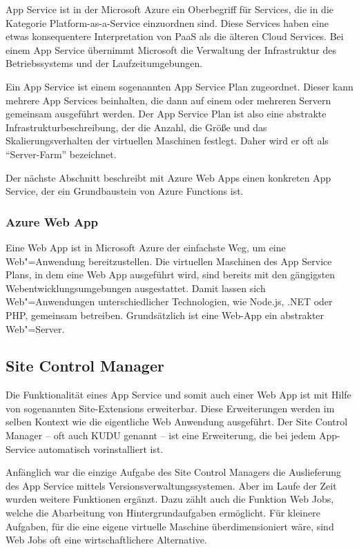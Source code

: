 App Service ist in der Microsoft Azure ein Oberbegriff für Services, die in die Kategorie Platform-as-a-Service einzuordnen sind. Diese Services haben eine etwas konsequentere Interpretation von PaaS als die älteren Cloud Services. Bei einem App Service übernimmt Microsoft die Verwaltung der Infrastruktur des Betriebssystems und der Laufzeitumgebungen. 

Ein App Service ist einem sogenannten App Service Plan zugeordnet. Dieser kann mehrere App Services beinhalten, die dann auf einem oder mehreren Servern gemeinsam ausgeführt werden. Der App Service Plan ist also eine abstrakte Infrastrukturbeschreibung, der die Anzahl, die Größe und das Skalierungsverhalten der virtuellen Maschinen festlegt. Daher wird er oft als "`Server-Farm"' bezeichnet.

Der nächste Abschnitt beschreibt mit Azure Web Apps einen konkreten App Service, der ein Grundbaustein von Azure Functions ist.

\subsubsection{Azure Web App}

Eine Web App ist in Microsoft Azure der einfachste Weg, um eine Web"=Anwendung bereitzustellen. Die virtuellen Maschinen des App Service Plans, in dem eine Web App ausgeführt wird, sind bereits mit den gängigsten Webentwicklungsumgebungen ausgestattet. Damit lassen sich Web"=Anwendungen unterschiedlicher Technologien, wie \zB Node.js, .NET oder PHP, gemeinsam betreiben. Grundsätzlich ist eine Web-App ein abstrakter Web"=Server.

\subsection{Site Control Manager}

Die Funktionalität eines App Service und somit auch einer Web App ist mit Hilfe von sogenannten Site-Extensions erweiterbar. Diese Erweiterungen werden im selben Kontext wie die eigentliche Web Anwendung ausgeführt. Der Site Control Manager -- oft auch KUDU genannt -- ist eine Erweiterung, die bei jedem App-Service automatisch vorinstalliert ist.

Anfänglich war die einzige Aufgabe des Site Control Managers die Auslieferung des App Service mittels Versionsverwaltungssystemen. Aber im Laufe der Zeit wurden weitere Funktionen ergänzt. Dazu zählt auch die Funktion Web Jobs, welche die Abarbeitung von Hintergrundaufgaben ermöglicht. Für kleinere Aufgaben, für die eine eigene virtuelle Maschine überdimensioniert wäre, sind Web Jobs oft eine wirtschaftlichere Alternative.

